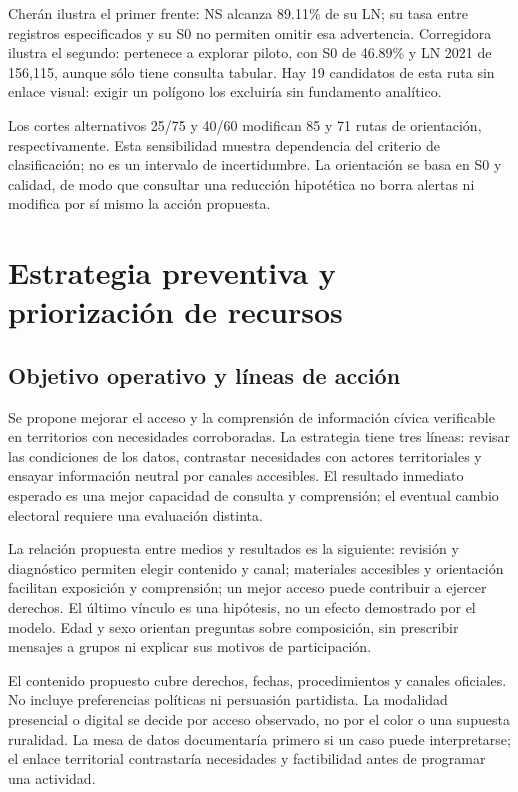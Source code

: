 \documentclass[12pt,a4paper]{article}
\newcommand{\primerparrafo}{\par\noindent\hspace*{1.1em}}
\newcommand{\iniciartabla}{\rowcolors{2}{NCSurfaceMuted}{white}}
\newcommand{\terminartabla}{\rowcolors{1}{}{}}
\newcommand{\pagina}[1]{\clearpage\section{#1}}
\begin{document}
Cherán ilustra el primer frente: NS alcanza 89.11\% de su LN; su tasa entre registros especificados y su S0 no permiten omitir esa advertencia. Corregidora ilustra el segundo: pertenece a explorar piloto, con S0 de 46.89\% y LN 2021 de 156,115, aunque sólo tiene consulta tabular. Hay 19 candidatos de esta ruta sin enlace visual: exigir un polígono los excluiría sin fundamento analítico.

Los cortes alternativos 25/75 y 40/60 modifican 85 y 71 rutas de orientación, respectivamente. Esta sensibilidad muestra dependencia del criterio de clasificación; no es un intervalo de incertidumbre. La orientación se basa en S0 y calidad, de modo que consultar una reducción hipotética no borra alertas ni modifica por sí mismo la acción propuesta.

\pagina{Estrategia preventiva y priorización de recursos}
\subsection{Objetivo operativo y líneas de acción}
\primerparrafo
Se propone mejorar el acceso y la comprensión de información cívica verificable en territorios con necesidades corroboradas. La estrategia tiene tres líneas: revisar las condiciones de los datos, contrastar necesidades con actores territoriales y ensayar información neutral por canales accesibles. El resultado inmediato esperado es una mejor capacidad de consulta y comprensión; el eventual cambio electoral requiere una evaluación distinta.

La relación propuesta entre medios y resultados es la siguiente: revisión y diagnóstico permiten elegir contenido y canal; materiales accesibles y orientación facilitan exposición y comprensión; un mejor acceso puede contribuir a ejercer derechos. El último vínculo es una hipótesis, no un efecto demostrado por el modelo. Edad y sexo orientan preguntas sobre composición, sin prescribir mensajes a grupos ni explicar sus motivos de participación.

\iniciartabla

\terminartabla

El contenido propuesto cubre derechos, fechas, procedimientos y canales oficiales. No incluye preferencias políticas ni persuasión partidista. La modalidad presencial o digital se decide por acceso observado, no por el color o una supuesta ruralidad. La mesa de datos documentaría primero si un caso puede interpretarse; el enlace territorial contrastaría necesidades y factibilidad antes de programar una actividad.
\end{document}
